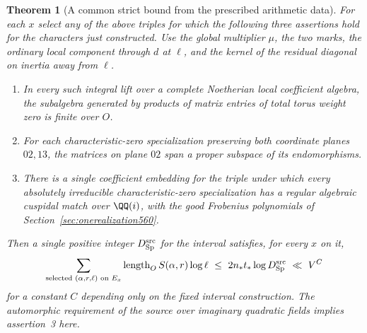 \documentclass[a4paper,11pt]{article}
\newtheorem{theorem}[proposition]{Theorem}
\theoremstyle{definition}
\theoremstyle{remark}
\numberwithin{equation}{section}
\begin{document}
\begin{theorem}[A common strict bound from the prescribed arithmetic data]
\leavevmode\label{thm:sourcecommon563}
For each \(x\) select any of the above triples for which the
following three assertions hold for the characters just constructed.
Use the global multiplier \(\mu\), the two marks, the ordinary
local component through \(d\) at \(\ell\), and the kernel of
the residual diagonal on inertia away from \(\ell\).
\begin{enumerate}
\item In every such integral lift over a complete Noetherian
local coefficient algebra, the subalgebra generated by
products of matrix entries of total torus weight zero is
finite over \(O\).
\item For each characteristic-zero specialization preserving
both coordinate planes \(02,13\), the matrices on plane \(02\)
span a proper subspace of its endomorphisms.
\item There is a single coefficient embedding for the triple
under which every absolutely irreducible characteristic-zero
specialization has a regular algebraic cuspidal match over
\(\QQ(i)\), with the good Frobenius polynomials of
Section~\ref{sec:onerealization560}.
\end{enumerate}
Then a single positive integer \(D_{\rm Sp}^{\rm src}\)
for the interval satisfies, for every \(x\) on it,
\[
 \sum_{\text{selected }(\alpha,r,\ell)\text{ on }E_x}
       \operatorname{length}_O S(\alpha,r)\log\ell
     \ \le\ 2n_*t_* \log D_{\rm Sp}^{\rm src}\ \ll\ V^C
\]
for a constant \(C\) depending only on the fixed interval
construction. The automorphic requirement of the source over
imaginary quadratic fields implies assertion~3 here.
\end{theorem}
\end{document}

